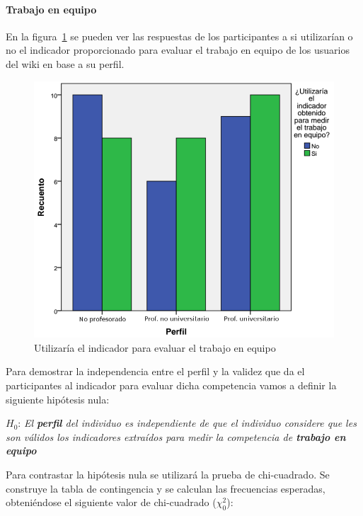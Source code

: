 \paragraph*{Trabajo en equipo}

En la figura~\ref{fig:app:barras:perfil:equipo} se pueden ver las respuestas de los participantes a si utilizarían o no el indicador proporcionado para evaluar el trabajo en equipo de los usuarios del wiki en base a su perfil.

\begin{figure}
  \begin{center}
    \includegraphics[scale=0.3]{barras_perfil_equipo.png}
  \end{center}
  \caption{Utilizaría el indicador para evaluar el trabajo en equipo}
  \label{fig:app:barras:perfil:equipo}
\end{figure}

Para demostrar la independencia entre el perfil y la validez que da el participantes al indicador para evaluar dicha competencia vamos a definir la siguiente hipótesis nula:

\begin{mdframed}[style=hipotesis0]
$H_0$: \emph{El \textbf{perfil} del individuo es independiente de que el individuo considere que les son válidos los indicadores extraídos para medir la competencia de \textbf{trabajo en equipo}}
\end{mdframed}

Para contrastar la hipótesis nula se utilizará la prueba de chi-cuadrado. Se construye la tabla de contingencia y se calculan las frecuencias esperadas, obteniéndose el siguiente valor de chi-cuadrado ($\chi^2_0$): 


